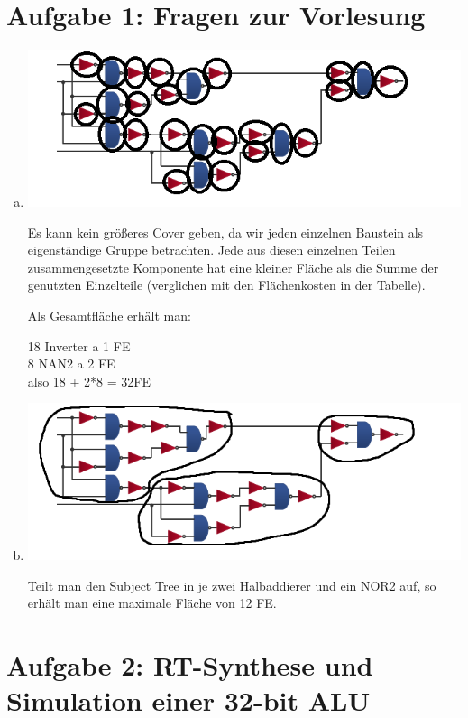 \documentclass[a4paper]{scrartcl}
\begin{document}
	
	\section*{Aufgabe 1: Fragen zur Vorlesung}
	
	\begin{enumerate}[(a)]
		\item \hfill
		
		\includegraphics[scale=1]{1_subject_tree_max_cover}
		
		Es kann kein größeres Cover geben, da wir jeden einzelnen Baustein als eigenständige Gruppe betrachten. Jede aus diesen einzelnen Teilen zusammengesetzte Komponente hat eine kleiner Fläche als die Summe der genutzten Einzelteile (verglichen mit den Flächenkosten in der Tabelle).
		
		Als Gesamtfläche erhält man:
		
		18 Inverter a 1 FE\\
		8 NAN2 a 2 FE\\
		
		also 18 + 2*8 = 32FE
		
		\item \hfill
		
		\includegraphics[scale=1]{1_subject_tree_12_cover}
		
		Teilt man den Subject Tree in je zwei Halbaddierer und ein NOR2 auf, so erhält man eine maximale Fläche von 12 FE.
		
	\end{enumerate}
	\newpage
	\section*{Aufgabe 2: RT-Synthese und Simulation einer 32-bit ALU}
	
\end{document}
